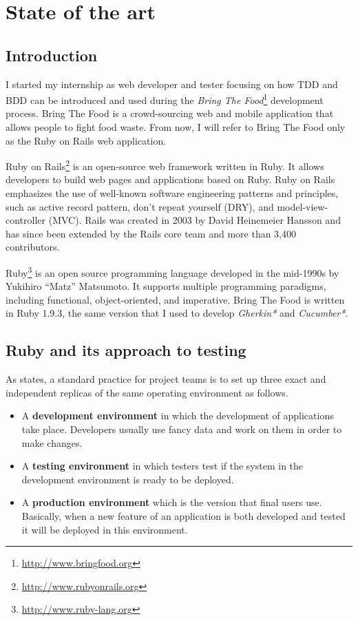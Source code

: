 \chapter{State of the art}

\section{Introduction}

I started my internship as web developer and tester focusing on how TDD and BDD can be introduced and used during the \textit{Bring The Food}\footnote{\url{http://www.bringfood.org}} development process. Bring The Food is a crowd-sourcing web and mobile application that allows people to fight food waste. From now, I will refer to Bring The Food only as the Ruby on Rails web application.

Ruby on Rails\footnote{\url{http://www.rubyonrails.org}} is an open-source web framework written in Ruby. It allows developers to build web pages and applications based on Ruby. Ruby on Rails emphasizes the use of well-known software engineering patterns and principles, such as active record pattern, don't repeat yourself (DRY), and model-view-controller (MVC). Rails was created in 2003 by David Heinemeier Hansson and has since been extended by the Rails core team and more than 3,400 contributors.

Ruby\footnote{\url{http://www.ruby-lang.org}} is an open source programming language developed in the mid-1990s by Yukihiro ``Matz'' Matsumoto. It supports multiple programming paradigms, including functional, object-oriented, and imperative. Bring The Food is written in Ruby 1.9.3, the same version that I used to develop \textit{Gherkin*} and \textit{Cucumber*}.

\section{Ruby and its approach to testing}

As \cite{book:villafiorita} states, a standard practice for project teams is to set up three exact and independent replicas of the same operating environment as follows.
\begin{itemize}
\item A \textbf{development environment} in which the development of applications take place. Developers usually use fancy data and work on them in order to make changes.
\item A \textbf{testing environment} in which testers test if the system in the development environment is ready to be deployed.
\item A \textbf{production environment} which is the version that final users use. Basically, when a new feature of an application is both developed and tested it will be deployed in this environment.
\end{itemize}

